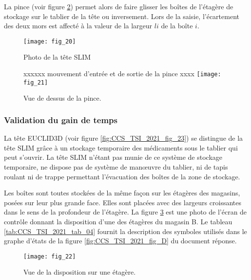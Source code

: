 La pince (voir figure \ref{fig:CCS_TSI_2021_fig_21}) permet alors de faire glisser les boîtes de l'étagère de stockage sur le tablier de la tête ou inversement. Lors de la saisie, l'écartement des deux mors est affecté à la valeur de la largeur $l i$ de la boîte $i$.

\begin{figure}
\centering
\texttt{[image: fig\_20]}

\caption{\label{fig:CCS_TSI_2021_fig_20}Photo de la tête SLIM}
\end{figure}



\begin{figure}
\centering
xxxxxx
mouvement d'entrée et de sortie de la pince
xxxx
\texttt{[image: fig\_21]}
\caption{\label{fig:CCS_TSI_2021_fig_21}Vue de dessus de la pince.}
\end{figure}

\subsubsection{Validation du gain de temps}

La tête EUCLID3D (voir figure \ref{fig:CCS_TSI_2021_fig_23}) se distingue de la tête SLIM grâce à un stockage temporaire des médicaments sous le tablier qui peut s'ouvrir. La tête SLIM n'étant pas munie de ce système de stockage temporaire, ne dispose pas de système de manœuvre du tablier, ni de tapis roulant ni de trappe permettant l'évacuation des boîtes de la zone de stockage.

Les boîtes sont toutes stockées de la même façon sur les étagères des magasins, posées sur leur plus grande face. Elles sont placées avec des largeurs croissantes dans le sens de la profondeur de l'étagère. La figure \ref{fig:CCS_TSI_2021_fig_22} est une photo de l'écran de contrôle donnant la disposition d'une des étagères du magasin B. Le tableau \ref{tab:CCS_TSI_2021_tab_04} fournit la description des symboles utilisés dans le graphe d'états de la figure \ref{fig:CCS_TSI_2021_fig_D} du document réponse.

\begin{figure}
\centering
\texttt{[image: fig\_22]}\\
\caption{\label{fig:CCS_TSI_2021_fig_22}Vue de la disposition sur une étagère.}
\end{figure}



